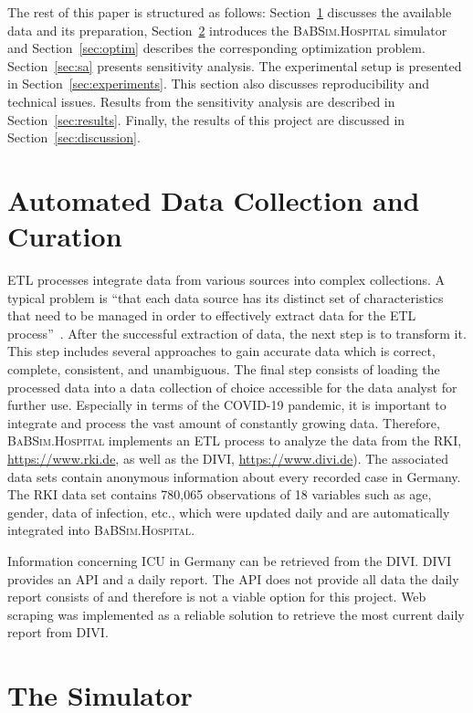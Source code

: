 \documentclass[conference]{IEEEtran}
\newcommand{\babsimhospital}{\textsc{BaBSim.Hospital}\xspace}
\begin{document}
The rest of this paper is structured as follows: 
Section~\ref{sec:data} discusses the available data and its preparation,
Section~\ref{sec:sim} introduces the \babsimhospital simulator and 
Section~\ref{sec:optim} describes the corresponding optimization problem. 
Section~\ref{sec:sa} presents sensitivity analysis.
The  experimental setup is presented in Section~\ref{sec:experiments}.
This section also discusses reproducibility and technical issues.
Results from the sensitivity analysis are described in Section~\ref{sec:results}.
Finally, the results of this project are discussed in Section~\ref{sec:discussion}.

\section{Automated Data Collection and Curation}\label{sec:data}
\gls{ETL} processes integrate data from various sources into complex collections. 
A typical problem is ``that each data source has its distinct set of characteristics 
that need to be managed in order to effectively extract data for the \gls{ETL} process''~\citep{ELSAPPAGH201191}. 
After the successful extraction of data, the next step is to transform it. 
This step includes several approaches to gain accurate data which is correct, complete, consistent, and unambiguous.  
The final step consists of loading the processed data into a data collection of choice accessible for the data analyst for further use.
Especially in terms of the COVID-19 pandemic, it is important to integrate and process the vast amount of constantly growing data. 
Therefore, \babsimhospital implements an \gls{ETL} process to analyze the data from the \gls{RKI}, \url{https://www.rki.de}, as well as the \gls{DIVI}, \url{https://www.divi.de}).
The associated data sets contain anonymous information about every recorded case in Germany. The \gls{RKI} data set contains 
780,065 observations of 18 variables such as age, gender, data of infection, etc., which were updated daily and are automatically integrated into \babsimhospital. 

Information concerning \gls{ICU} in Germany can be retrieved from the \gls{DIVI}.
\gls{DIVI} provides an API and a daily report. The API does not provide all data the daily report consists of and therefore is not a viable option for this project.
Web scraping was implemented as a reliable solution to retrieve the most current daily report from \gls{DIVI}.


\section{The Simulator}\label{sec:sim}
\end{document}
